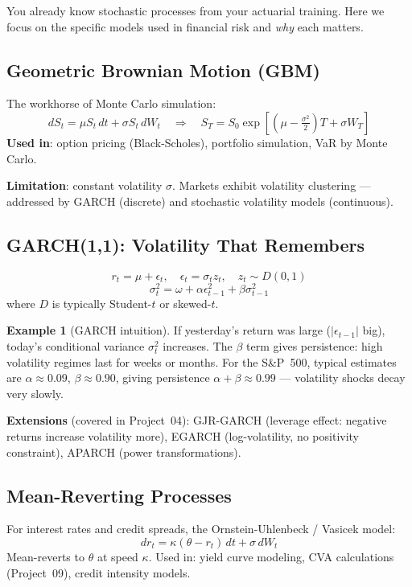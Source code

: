 \documentclass[11pt, a4paper]{article}
\theoremstyle{definition}
\newtheorem{example}{Example}[section]
\theoremstyle{plain}
\theoremstyle{remark}
\begin{document}
You already know stochastic processes from your actuarial training.
Here we focus on the specific models used in financial risk and \emph{why} each matters.

\subsection{Geometric Brownian Motion (GBM)}

The workhorse of Monte Carlo simulation:
\[
    dS_t = \mu S_t \, dt + \sigma S_t \, dW_t
    \quad \Longrightarrow \quad
    S_T = S_0 \exp\!\left[\left(\mu - \tfrac{\sigma^2}{2}\right)T + \sigma W_T\right]
\]
\textbf{Used in}: option pricing (Black-Scholes), portfolio simulation, VaR by Monte Carlo.

\textbf{Limitation}: constant volatility $\sigma$.
Markets exhibit volatility clustering --- addressed by GARCH (discrete) and stochastic volatility models (continuous).

\subsection{GARCH(1,1): Volatility That Remembers}

\[
    r_t = \mu + \epsilon_t, \quad \epsilon_t = \sigma_t z_t, \quad z_t \sim D(0,1)
\]
\[
    \sigma_t^2 = \omega + \alpha \epsilon_{t-1}^2 + \beta \sigma_{t-1}^2
\]
where $D$ is typically Student-$t$ or skewed-$t$.

\begin{example}[GARCH intuition]
If yesterday's return was large ($|\epsilon_{t-1}|$ big), today's conditional variance $\sigma_t^2$ increases.
The $\beta$ term gives persistence: high volatility regimes last for weeks or months.
For the S\&P~500, typical estimates are $\alpha \approx 0.09$, $\beta \approx 0.90$, giving persistence $\alpha + \beta \approx 0.99$ --- volatility shocks decay very slowly.
\end{example}

\textbf{Extensions} (covered in Project~04): GJR-GARCH (leverage effect: negative returns increase volatility more), EGARCH (log-volatility, no positivity constraint), APARCH (power transformations).

\subsection{Mean-Reverting Processes}

For interest rates and credit spreads, the Ornstein-Uhlenbeck / Vasicek model:
\[
    dr_t = \kappa(\theta - r_t)\,dt + \sigma\,dW_t
\]
Mean-reverts to $\theta$ at speed $\kappa$.
Used in: yield curve modeling, CVA calculations (Project~09), credit intensity models.
\end{document}
